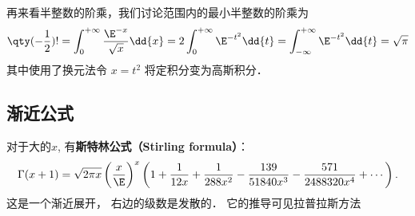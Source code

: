 再来看半整数的阶乘，我们讨论范围内的最小半整数的阶乘为 
\begin{equation}
\qty(-\frac12) ! = \int_0^{+\infty} \frac{\E^{-x}}{\sqrt x}\dd{x} = 2\int_0^{+\infty} \E^{-t^2} \dd{t} = \int_{-\infty}^{+\infty} \E^{-t^2} \dd{t} = \sqrt{\pi}
\end{equation}
其中使用了换元法令 $x = t^2$ 将定积分变为高斯积分．

\subsection{渐近公式}
对于大的$x$, 有\textbf{斯特林公式（Stirling formula）}：
$$
\Gamma(x+1)
  =\sqrt{2\pi x}\left({x\over \E}\right)^x
  \left(
   1
   +{1\over12x}
   +{1\over288x^2}
   -{139\over51840x^3}
   -{571\over2488320x^4}
   + \cdots
  \right).
$$
这是一个渐近展开， 右边的级数是发散的． 它的推导可见拉普拉斯方法